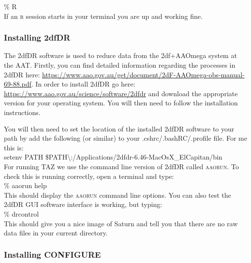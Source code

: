 \documentclass[12pt]{article}
\begin{document}
\hspace{10mm} \% R\\

If an \textsc{r} session starts in your terminal you are up and working fine.

\subsubsection{Installing 2dfDR}

The 2dfDR software is used to reduce data from the 2df+AAOmega system at the AAT. Firstly, you can find detailed information regarding the processes in 2dfDR here:  \url{https://www.aao.gov.au/get/document/2dF-AAOmega-obs-manual-69-88.pdf}. In order to install 2dfDR go here: \url{https://www.aao.gov.au/science/software/2dfdr} and download the appropriate version for your operating system. You will then need to follow the installation instructions.

You will then need to set the location of the installed 2dfDR software to your path by add the following (or similar) to your .cshrc/.bashRC/.profile file. For me this is: \\


\hspace{10mm} setenv PATH \$PATH\textbackslash:/Applications/2dfdr-6.46-MacOsX\_ElCapitan/bin \\

For running \textsc{TAZ} we use the command line version of 2dfDR called \textsc{aaorun}. To check this is running correctly, open a terminal and type: \\

\hspace{10mm} \% aaorun help\\

This should display the  \textsc{aaorun} command line options. You can also test the 2dfDR GUI software interface is working, but typing: \\

 
\hspace{10mm} \% drcontrol\\

This should give you a nice image of Saturn and tell you that there are no raw data files in your current directory.

\subsubsection{Installing CONFIGURE}
\end{document}
